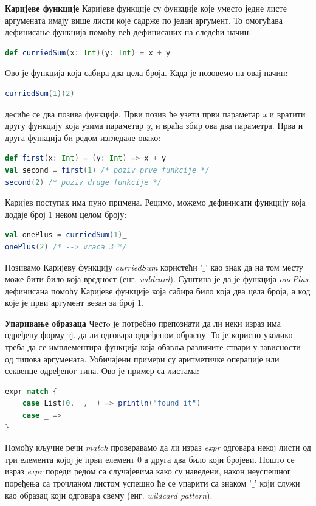 \documentclass[12pt,oneside]{memoir}
\begin{document}
\begin{description}
\item \textbf{Каријеве функције} %
Каријеве функције су функције које уместо једне листе аргумената имају више листи које садрже по један аргумент. То омогућава дефинисање функција помоћу већ дефинисаних на следећи начин:
\begin{lstlisting}[language=Scala]
def curriedSum(x: Int)(y: Int) = x + y
\end{lstlisting}
Ово је функција која сабира два цела броја. Када је позовемо на овај начин:
\begin{lstlisting}[language=Scala]
curriedSum(1)(2)
\end{lstlisting}
десиће се два позива функције. Први позив ће узети први параметар \textit{x} и вратити другу функцију која узима параметар \textit{y}, и враћа збир ова два параметра. Прва и друга функција би редом изгледале овако:
\begin{lstlisting}[language=Scala]
def first(x: Int) = (y: Int) => x + y
val second = first(1) /* poziv prve funkcije */
second(2) /* poziv druge funkcije */
\end{lstlisting}
Каријев поступак има пуно примена. Рецимо, можемо дефинисати функцију која додаје број 1 неком целом броју:
\begin{lstlisting}[language=Scala]
val onePlus = curriedSum(1)_
onePlus(2) /* --> vraca 3 */
\end{lstlisting}
Позивамо Каријеву функцију \textit{curriedSum} користећи '$\_$' као знак да на том месту може бити било која вредност (енг. \textit{wildcard}). Суштина је да је функција \textit{onePlus} дефинисана помоћу Каријеве функције која сабира било која два цела броја, а код које је први аргумент везан за број 1.
\item \textbf{Упаривање образаца}
\label{uparObr}
Честo је потребно препознати да ли неки израз има одређену форму тј. да ли одговара одређеном обрасцу. То је корисно уколико треба да се имплементира функција која обавља различите ствари у зависности од типова аргумената. Уобичајени примери су аритметичке операције или секвенце одређеног типа. Ово је пример са листама: 
\begin{lstlisting}[language=Scala]
expr match {
	case List(0, _, _) => println("found it")
	case _ =>
}
\end{lstlisting}
Помоћу кључне речи \textit{match} проверавамо да ли израз \textit{expr} одговара некој листи од три елемента којој је први елемент 0 а друга два било који бројеви. Пошто се израз \textit{expr} пореди редом са случајевима како су наведени, након неуспешног поређења са трочланом листом успешно ће се упарити са знаком '$\_$' који служи као образац који одговара свему (енг. \textit{wildcard pattern}). 


\end{description}
\end{document}
